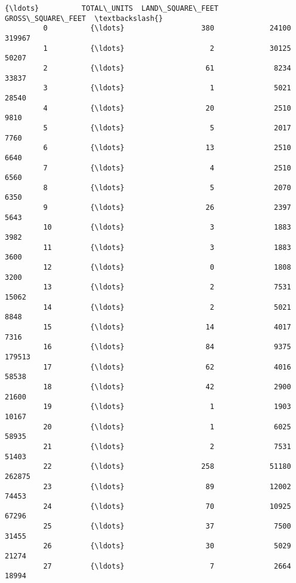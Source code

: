 \documentclass[11pt]{article}
\begin{document}
\begin{Verbatim}[commandchars=\\\{\}]
                    {\ldots}          TOTAL\_UNITS  LAND\_SQUARE\_FEET  GROSS\_SQUARE\_FEET  \textbackslash{}
         0          {\ldots}                  380             24100             319967   
         1          {\ldots}                    2             30125              50207   
         2          {\ldots}                   61              8234              33837   
         3          {\ldots}                    1              5021              28540   
         4          {\ldots}                   20              2510               9810   
         5          {\ldots}                    5              2017               7760   
         6          {\ldots}                   13              2510               6640   
         7          {\ldots}                    4              2510               6560   
         8          {\ldots}                    5              2070               6350   
         9          {\ldots}                   26              2397               5643   
         10         {\ldots}                    3              1883               3982   
         11         {\ldots}                    3              1883               3600   
         12         {\ldots}                    0              1808               3200   
         13         {\ldots}                    2              7531              15062   
         14         {\ldots}                    2              5021               8848   
         15         {\ldots}                   14              4017               7316   
         16         {\ldots}                   84              9375             179513   
         17         {\ldots}                   62              4016              58538   
         18         {\ldots}                   42              2900              21600   
         19         {\ldots}                    1              1903              10167   
         20         {\ldots}                    1              6025              58935   
         21         {\ldots}                    2              7531              51403   
         22         {\ldots}                  258             51180             262875   
         23         {\ldots}                   89             12002              74453   
         24         {\ldots}                   70             10925              67296   
         25         {\ldots}                   37              7500              31455   
         26         {\ldots}                   30              5029              21274   
         27         {\ldots}                    7              2664              18994   

\end{Verbatim}
\end{document}
